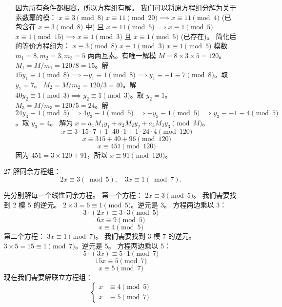 \begin{enumerate}
\begin{solution}
\begin{enumerate}
            因为所有条件都相容，所以方程组有解。
            我们可以将原方程组分解为关于素数幂的模：
            $x \equiv 3 \pmod 8$
            $x \equiv 11 \pmod{20} \implies x \equiv 11 \pmod 4$ (已包含在 $x \equiv 3 \pmod 8$ 中) 且 $x \equiv 11 \pmod 5 \implies x \equiv 1 \pmod 5$.
            $x \equiv 1 \pmod{15} \implies x \equiv 1 \pmod 3$ 且 $x \equiv 1 \pmod 5$ (已存在)。
            简化后的等价方程组为：
            $x \equiv 3 \pmod 8$
            $x \equiv 1 \pmod 3$
            $x \equiv 1 \pmod 5$
            模数 $m_1=8, m_2=3, m_3=5$ 两两互素。有唯一解模 $M = 8 \times 3 \times 5 = 120$。
            $M_1 = M/m_1 = 120/8 = 15$。解 $15y_1 \equiv 1 \pmod 8 \implies -y_1 \equiv 1 \pmod 8 \implies y_1 \equiv -1 \equiv 7 \pmod 8$。取 $y_1=7$。
            $M_2 = M/m_2 = 120/3 = 40$。解 $40y_2 \equiv 1 \pmod 3 \implies y_2 \equiv 1 \pmod 3$。取 $y_2=1$。
            $M_3 = M/m_3 = 120/5 = 24$。解 $24y_3 \equiv 1 \pmod 5 \implies 4y_3 \equiv 1 \pmod 5 \implies -y_3 \equiv 1 \pmod 5 \implies y_3 \equiv -1 \equiv 4 \pmod 5$。取 $y_3=4$。
            解为 $x = a_1 M_1 y_1 + a_2 M_2 y_2 + a_3 M_3 y_3 \pmod M$。
            \[ x \equiv 3 \cdot 15 \cdot 7 + 1 \cdot 40 \cdot 1 + 1 \cdot 24 \cdot 4 \pmod{120} \]
            \[ x \equiv 315 + 40 + 96 \pmod{120} \]
            \[ x \equiv 451 \pmod{120} \]
            因为 $451 = 3 \times 120 + 91$，所以 $x \equiv 91 \pmod{120}$。
        \end{enumerate}
    \end{solution}
    \item[27] 解同余方程组：
    $$
    2 x \equiv 3(\bmod 5), \quad 3 x \equiv 1(\bmod 7).
    $$    
    \begin{solution}
        先分别解每一个线性同余方程。
        第一个方程： $2x \equiv 3 \pmod 5$。
        我们需要找到 2 模 5 的逆元。 $2 \times 3 = 6 \equiv 1 \pmod 5$。逆元是 3。
        方程两边乘以 3：
        \[ 3 \cdot (2x) \equiv 3 \cdot 3 \pmod 5 \]
        \[ 6x \equiv 9 \pmod 5 \]
        \[ x \equiv 4 \pmod 5 \]
        第二个方程： $3x \equiv 1 \pmod 7$。
        我们需要找到 3 模 7 的逆元。 $3 \times 5 = 15 \equiv 1 \pmod 7$。逆元是 5。
        方程两边乘以 5：
        \[ 5 \cdot (3x) \equiv 5 \cdot 1 \pmod 7 \]
        \[ 15x \equiv 5 \pmod 7 \]
        \[ x \equiv 5 \pmod 7 \]
        现在我们需要解联立方程组：
        $$
        \left\{\begin{aligned}
        x & \equiv 4 \pmod 5 \\
        x & \equiv 5 \pmod 7
        \end{aligned}\right.
$$
\end{solution}
\end{enumerate}
